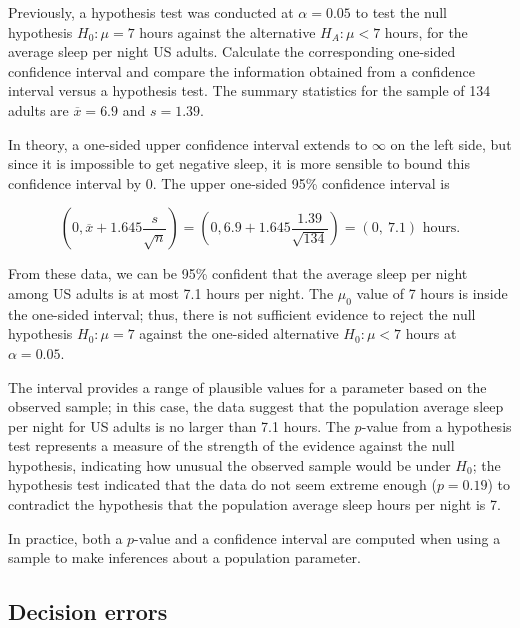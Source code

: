 \begin{examplewrap}
\begin{nexample}{Previously, a hypothesis test was conducted at $\alpha = 0.05$ to test the null hypothesis $H_0: \mu = 7$ hours against the alternative $H_A: \mu < 7$ hours, for the average sleep per night US adults. Calculate the corresponding one-sided confidence interval and compare the information obtained from a confidence interval versus a hypothesis test. The summary statistics for the sample of 134 adults are $\overline{x} = 6.9$ and $s = 1.39$.}	

In theory, a one-sided upper confidence interval extends to $\infty$ on the left side, but since it is impossible to get negative sleep, it is more sensible to bound this confidence interval by 0.  The upper one-sided 95\% confidence interval is

\[(0, \overline{x} + 1.645 \dfrac{s}{\sqrt{n}}) = (0, 6.9 + 1.645\dfrac{1.39}{\sqrt{134}}) = (0, \ 7.1)\text{ hours.} \]

From these data, we can be 95\% confident that the average sleep per night among US adults is at most 7.1 hours per night. The $\mu_0$ value of 7 hours is inside the one-sided interval; thus, there is not sufficient evidence to reject the null hypothesis $H_0: \mu = 7$ against the one-sided alternative $H_0: \mu < 7$ hours at $\alpha = 0.05$. 

The interval provides a range of plausible values for a parameter based on the observed sample; in this case, the data suggest that the population average sleep per night for US adults is no larger than 7.1 hours. The $p$-value from a hypothesis test represents a measure of the strength of the evidence against the null hypothesis, indicating how unusual the observed sample would be under $H_0$; the hypothesis test indicated that the data do not seem extreme enough ($p = 0.19$) to contradict the hypothesis that the population average sleep hours per night is 7. 

In practice, both a $p$-value and a confidence interval are computed when using a sample to make inferences about a population parameter.
\end{nexample}
\end{examplewrap}\textD{\vspace{5mm}}


\subsection{Decision errors}

